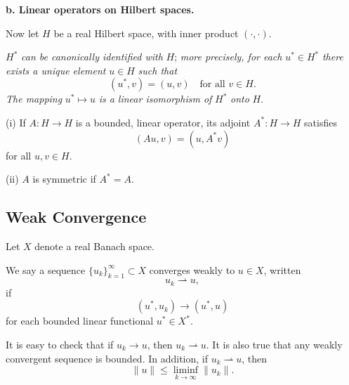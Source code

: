\textbf{b. Linear operators on Hilbert spaces.}

Now let $H$ be a real Hilbert space, with inner product $(\cdot, \cdot)$.

\begin{theorem}
\label{thm:riesz-representation-theorem}
$H^*$ \textit{can be canonically identified with} $H$; \textit{more precisely, for each} $u^* \in H^*$ \textit{there exists a unique element} $u \in H$ \textit{such that}
$$(u^*, v) = (u, v) \quad \text{for all } v \in H.$$
\textit{The mapping} $u^* \mapsto u$ \textit{is a linear isomorphism of} $H^*$ \textit{onto} $H$.
\end{theorem}

\begin{definition}
\label{def:adjoint-symmetric-operator}
(i) If $A : H \to H$ is a bounded, linear operator, its adjoint $A^* : H \to H$ satisfies
$$(Au, v) = (u, A^* v)$$
for all $u, v \in H$.

(ii) $A$ is symmetric if $A^* = A$.
\end{definition}

\subsection{Weak Convergence}
\label{sec:weak-convergence-appendix-d}

Let $X$ denote a real Banach space.

\begin{definition}
\label{def:weak-convergence}
We say a sequence $\{u_k\}_{k=1}^\infty \subset X$ converges weakly to $u \in X$, written
$$u_k \rightharpoonup u,$$
if
$$(u^*, u_k) \to (u^*, u)$$
for each bounded linear functional $u^* \in X^*$.
\end{definition}

\begin{remark}
\label{rem:weak-convergence-basic-properties}
It is easy to check that if $u_k \to u$, then $u_k \rightharpoonup u$. It is also true that any weakly convergent sequence is bounded. In addition, if $u_k \rightharpoonup u$, then
$$\|u\| \le \liminf_{k \to \infty} \|u_k\|.$$
\end{remark}

